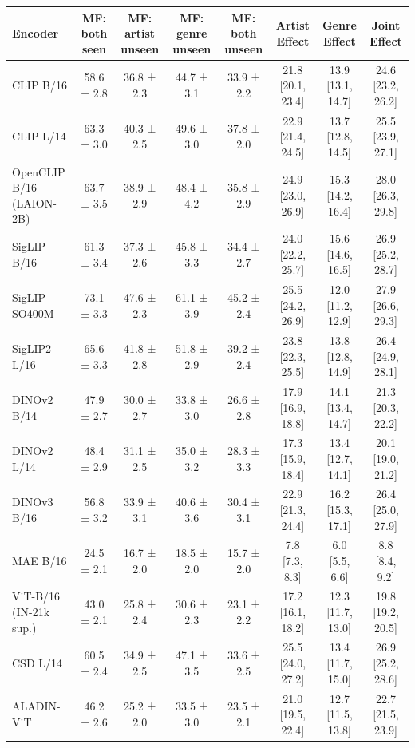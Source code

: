 \begin{tabular}{lccccccc}
\toprule
Encoder & MF: both seen & MF: artist unseen & MF: genre unseen & MF: both unseen & Artist Effect & Genre Effect & Joint Effect \\
\midrule
CLIP B/16 & 58.6 ± 2.8 & 36.8 ± 2.3 & 44.7 ± 3.1 & 33.9 ± 2.2 & 21.8 [20.1, 23.4] & 13.9 [13.1, 14.7] & 24.6 [23.2, 26.2] \\
CLIP L/14 & 63.3 ± 3.0 & 40.3 ± 2.5 & 49.6 ± 3.0 & 37.8 ± 2.0 & 22.9 [21.4, 24.5] & 13.7 [12.8, 14.5] & 25.5 [23.9, 27.1] \\
OpenCLIP B/16 (LAION-2B) & 63.7 ± 3.5 & 38.9 ± 2.9 & 48.4 ± 4.2 & 35.8 ± 2.9 & 24.9 [23.0, 26.9] & 15.3 [14.2, 16.4] & 28.0 [26.3, 29.8] \\
SigLIP B/16 & 61.3 ± 3.4 & 37.3 ± 2.6 & 45.8 ± 3.3 & 34.4 ± 2.7 & 24.0 [22.2, 25.7] & 15.6 [14.6, 16.5] & 26.9 [25.2, 28.7] \\
SigLIP SO400M & 73.1 ± 3.3 & 47.6 ± 2.3 & 61.1 ± 3.9 & 45.2 ± 2.4 & 25.5 [24.2, 26.9] & 12.0 [11.2, 12.9] & 27.9 [26.6, 29.3] \\
SigLIP2 L/16 & 65.6 ± 3.3 & 41.8 ± 2.8 & 51.8 ± 2.9 & 39.2 ± 2.4 & 23.8 [22.3, 25.5] & 13.8 [12.8, 14.9] & 26.4 [24.9, 28.1] \\
DINOv2 B/14 & 47.9 ± 2.7 & 30.0 ± 2.7 & 33.8 ± 3.0 & 26.6 ± 2.8 & 17.9 [16.9, 18.8] & 14.1 [13.4, 14.7] & 21.3 [20.3, 22.2] \\
DINOv2 L/14 & 48.4 ± 2.9 & 31.1 ± 2.5 & 35.0 ± 3.2 & 28.3 ± 3.3 & 17.3 [15.9, 18.4] & 13.4 [12.7, 14.1] & 20.1 [19.0, 21.2] \\
DINOv3 B/16 & 56.8 ± 3.2 & 33.9 ± 3.1 & 40.6 ± 3.6 & 30.4 ± 3.1 & 22.9 [21.3, 24.4] & 16.2 [15.3, 17.1] & 26.4 [25.0, 27.9] \\
MAE B/16 & 24.5 ± 2.1 & 16.7 ± 2.0 & 18.5 ± 2.0 & 15.7 ± 2.0 & 7.8 [7.3, 8.3] & 6.0 [5.5, 6.6] & 8.8 [8.4, 9.2] \\
ViT-B/16 (IN-21k sup.) & 43.0 ± 2.1 & 25.8 ± 2.4 & 30.6 ± 2.3 & 23.1 ± 2.2 & 17.2 [16.1, 18.2] & 12.3 [11.7, 13.0] & 19.8 [19.2, 20.5] \\
CSD L/14 & 60.5 ± 2.4 & 34.9 ± 2.5 & 47.1 ± 3.5 & 33.6 ± 2.5 & 25.5 [24.0, 27.2] & 13.4 [11.7, 15.0] & 26.9 [25.2, 28.6] \\
ALADIN-ViT & 46.2 ± 2.6 & 25.2 ± 2.0 & 33.5 ± 3.0 & 23.5 ± 2.1 & 21.0 [19.5, 22.4] & 12.7 [11.5, 13.8] & 22.7 [21.5, 23.9] \\
\bottomrule
\end{tabular}
